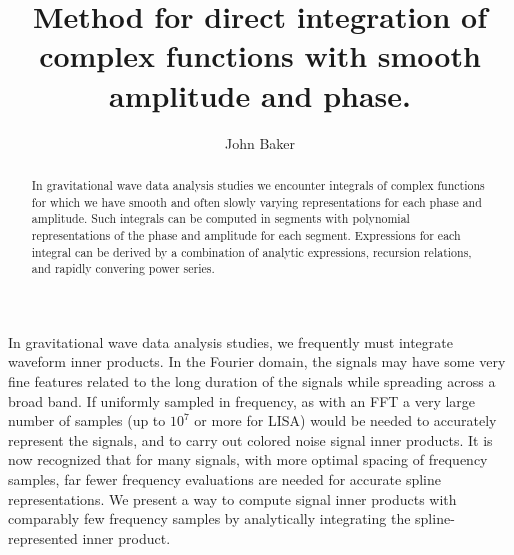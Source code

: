 \documentclass{revtex4}
\begin{document}
\title{Method for direct integration of complex functions with smooth amplitude and phase.}
\begin{abstract}
In gravitational wave data analysis studies we encounter integrals of complex functions for which we have smooth and often slowly varying representations for each phase and amplitude.  Such integrals can be computed in segments with polynomial representations of the phase and amplitude for each segment.  Expressions for each integral can be derived by a combination of analytic expressions, recursion relations, and rapidly convering power series.
\end{abstract}
\author{John Baker}
\maketitle

In gravitational wave data analysis studies, we frequently must integrate waveform inner products.  In the Fourier domain, the signals may have some very fine features related to the long duration of the signals while spreading across a broad band.  If uniformly sampled in frequency, as with an FFT a very large number of samples (up to $10^7$ or more for LISA) would be needed to accurately represent the signals, and to carry out colored noise signal inner products. It is now recognized that for many signals, with more optimal spacing of frequency samples, far fewer frequency evaluations are needed for accurate spline representations.  We present a way to compute signal inner products with comparably few frequency samples by analytically integrating the spline-represented inner product. 
\end{document}
